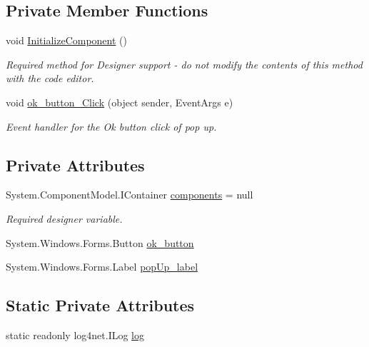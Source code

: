 \subsection*{Private Member Functions}
\begin{DoxyCompactItemize}
\item 
void \hyperlink{classWildlifeTrackingApp_1_1PopUp_a6405d5db675d5338663195a4d12b4c9f}{Initialize\+Component} ()
\begin{DoxyCompactList}\small\item\em Required method for Designer support -\/ do not modify the contents of this method with the code editor. \end{DoxyCompactList}\item 
void \hyperlink{classWildlifeTrackingApp_1_1PopUp_aacb4f2fe113c4f620d97ffae6a93d313}{ok\+\_\+button\+\_\+\+Click} (object sender, Event\+Args e)
\begin{DoxyCompactList}\small\item\em Event handler for the Ok button click of pop up. \end{DoxyCompactList}\end{DoxyCompactItemize}
\subsection*{Private Attributes}
\begin{DoxyCompactItemize}
\item 
System.\+Component\+Model.\+I\+Container \hyperlink{classWildlifeTrackingApp_1_1PopUp_a02595f1c09713bb71dcb2fbbfc7ffa4b}{components} = null
\begin{DoxyCompactList}\small\item\em Required designer variable. \end{DoxyCompactList}\item 
System.\+Windows.\+Forms.\+Button \hyperlink{classWildlifeTrackingApp_1_1PopUp_acf8fb040918df446cb67b4a46855c4bc}{ok\+\_\+button}
\item 
System.\+Windows.\+Forms.\+Label \hyperlink{classWildlifeTrackingApp_1_1PopUp_a380f8b00794cde9d42ecbee01b0376fa}{pop\+Up\+\_\+label}
\end{DoxyCompactItemize}
\subsection*{Static Private Attributes}
\begin{DoxyCompactItemize}
\item 
static readonly log4net.\+I\+Log \hyperlink{classWildlifeTrackingApp_1_1PopUp_ae6c6142b8525b2f4ac6ee6e003b3106f}{log}
\end{DoxyCompactItemize}


